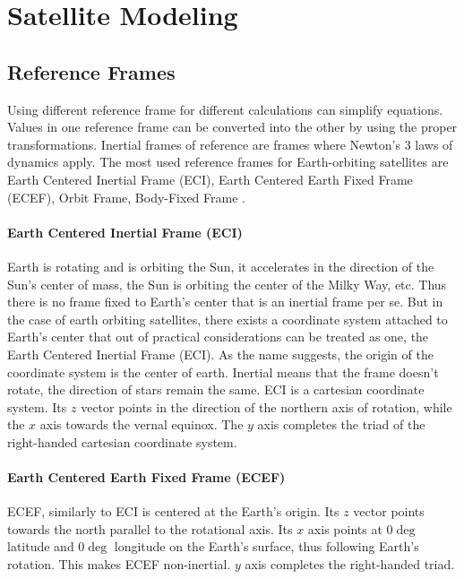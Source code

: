 \chapter{Satellite Modeling}

\section{Reference Frames}

Using different reference frame for different calculations can simplify equations. Values in one reference frame can be converted into the other by using the proper transformations.
Inertial frames of reference are frames where Newton's 3 laws of dynamics apply.
The most used reference frames for Earth-orbiting satellites are Earth Centered Inertial Frame (ECI), Earth Centered Earth Fixed Frame (ECEF), Orbit Frame, Body-Fixed Frame  \cite{ref1} \cite{ref2}.

\subsubsection{Earth Centered Inertial Frame (ECI)}
Earth is rotating and is orbiting the Sun, it accelerates in the direction of the Sun's center of mass, the Sun is orbiting the center of the Milky Way, etc. Thus there is no frame fixed to Earth's center that is an inertial frame per se. But in the case of earth orbiting satellites, there exists a coordinate system attached to Earth's center that out of practical considerations can be treated as one, the Earth Centered Inertial Frame (ECI).
As the name suggests, the origin of the coordinate system is the center of earth. Inertial means that the frame doesn't rotate, the direction of stars remain the same. 
ECI is a cartesian coordinate system. Its $z$ vector points in the direction of the northern axis of rotation, while the $x$ axis towards the vernal equinox. The $y$ axis completes the triad of the right-handed cartesian coordinate system.




\subsubsection{Earth Centered Earth Fixed Frame (ECEF)}

ECEF, similarly to ECI is centered at the Earth's origin. Its $z$ vector points towards the north parallel to the rotational axis. Its $x$ axis points at $0\deg$ latitude and $0\deg$ longitude on the Earth's surface, thus following Earth's rotation. This makes ECEF non-inertial. $y$ axis completes the right-handed triad.

